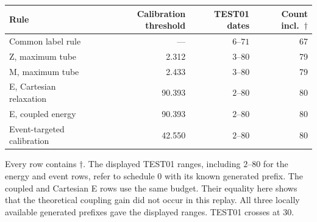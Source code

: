 \documentclass[11pt]{article}
\theoremstyle{noteplain}
\newcommand{\dd}{\dagger}
\begin{document}
\begin{center}
\small
\begin{tabular}{lrrr}
\toprule
Rule & Calibration threshold & TEST01 dates & Count incl.\ $\dd$\\
\midrule
Common label rule & --- & $6$--$71$ & 67\\
Z, maximum tube & 2.312 & $3$--$80$ & 79\\
M, maximum tube & 2.433 & $3$--$80$ & 79\\
E, Cartesian relaxation & 90.393 & $2$--$80$ & 80\\
E, coupled energy & 90.393 & $2$--$80$ & 80\\
Event-targeted calibration & 42.550 & $2$--$80$ & 80\\
\bottomrule
\end{tabular}
\end{center}
Every row contains $\dd$. The displayed TEST01 ranges, including $2$--$80$ for the energy and event rows, refer to schedule 0 with its known generated prefix. The coupled and Cartesian E rows use the same budget. Their equality here shows that the theoretical coupling gain did not occur in this replay. All three locally available generated prefixes gave the displayed ranges. TEST01 crosses at 30.
\end{document}
